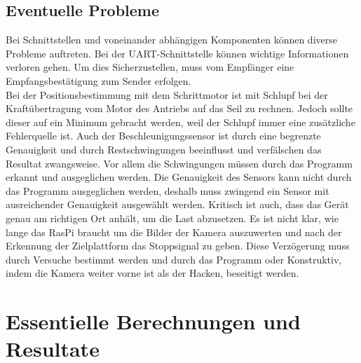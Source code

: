 \documentclass[a4paper]{report}
\begin{document}
\subsection{Eventuelle Probleme}
\label{ssec:EvtlProb}
Bei Schnittstellen und voneinander abhängigen Komponenten können diverse Probleme auftreten. Bei der UART-Schnittstelle können wichtige Informationen verloren gehen. Um dies Sicherzustellen, muss vom Empfänger eine Empfangsbestätigung zum Sender erfolgen.\\
Bei der Positionsbestimmung mit dem Schrittmotor ist mit Schlupf bei der Kraftübertragung vom Motor des Antriebs auf das Seil zu rechnen. Jedoch sollte dieser auf ein Minimum gebracht werden, weil der Schlupf immer eine zusätzliche Fehlerquelle ist. Auch der Beschleunigungssensor ist durch eine begrenzte Genauigkeit und durch Restschwingungen beeinflusst und verfälschen das Resultat zwangsweise. Vor allem die Schwingungen müssen durch das Programm erkannt und ausgeglichen werden. Die Genauigkeit des Sensors kann nicht durch das Programm ausgeglichen werden, deshalb muss zwingend ein Sensor mit ausreichender Genauigkeit ausgewählt werden.
Kritisch ist auch, dass das Gerät genau am richtigen Ort anhält, um die Last abzusetzen. Es ist nicht klar, wie lange das RasPi braucht um die Bilder der Kamera auszuwerten und nach der Erkennung der Zielplattform das Stoppsignal zu geben. Diese Verzögerung muss durch Versuche bestimmt werden und durch das Programm oder Konstruktiv, indem die Kamera weiter vorne ist als der Hacken, beseitigt werden.

\section{Essentielle Berechnungen und Resultate}
\label{sec:EssBerechnung}
\end{document}
